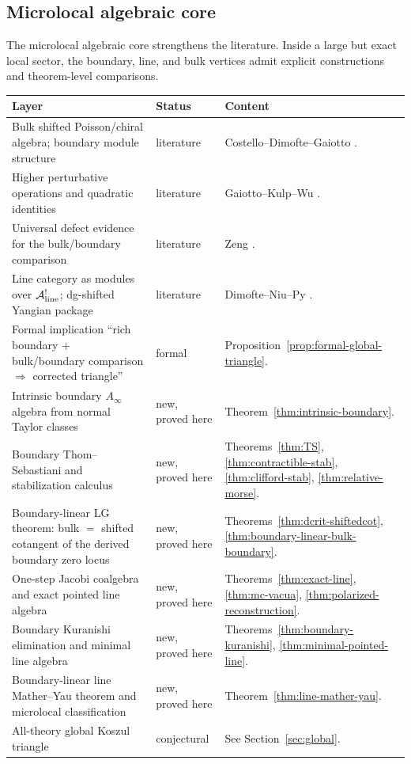 \subsection{Microlocal algebraic core}

The microlocal algebraic core strengthens the literature. Inside a large but exact local sector, the boundary, line, and bulk vertices admit explicit constructions and theorem-level comparisons.

\begin{center}
\renewcommand{\arraystretch}{1.2}
\begin{longtable}{|p{}|p{}|p{}|}
\hline
\textbf{Layer} & \textbf{Status} & \textbf{Content} \\
\hline
Bulk shifted Poisson/chiral algebra; boundary module structure & literature & Costello--Dimofte--Gaiotto \cite{CDG20}. \\
\hline
Higher perturbative operations and quadratic identities & literature & Gaiotto--Kulp--Wu \cite{GKW24}. \\
\hline
Universal defect evidence for the bulk/boundary comparison & literature & Zeng \cite{Zeng23}. \\
\hline
Line category as modules over $\mathcal{A}^!_{\mathrm{line}}$; dg-shifted Yangian package & literature & Dimofte--Niu--Py \cite{DNP25}. \\
\hline
Formal implication ``rich boundary + bulk/boundary comparison $\Rightarrow$ corrected triangle'' & formal & Proposition~\ref{prop:formal-global-triangle}. \\
\hline
Intrinsic boundary $A_\infty$ algebra from normal Taylor classes & new, proved here & Theorem~\ref{thm:intrinsic-boundary}. \\
\hline
Boundary Thom--Sebastiani and stabilization calculus & new, proved here & Theorems~\ref{thm:TS}, \ref{thm:contractible-stab}, \ref{thm:clifford-stab}, \ref{thm:relative-morse}. \\
\hline
Boundary-linear LG theorem: bulk $=$ shifted cotangent of the derived boundary zero locus & new, proved here & Theorems~\ref{thm:dcrit-shiftedcot}, \ref{thm:boundary-linear-bulk-boundary}. \\
\hline
One-step Jacobi coalgebra and exact pointed line algebra & new, proved here & Theorems~\ref{thm:exact-line}, \ref{thm:mc-vacua}, \ref{thm:polarized-reconstruction}. \\
\hline
Boundary Kuranishi elimination and minimal line algebra & new, proved here & Theorems~\ref{thm:boundary-kuranishi}, \ref{thm:minimal-pointed-line}. \\
\hline
Boundary-linear line Mather--Yau theorem and microlocal classification & new, proved here & Theorem~\ref{thm:line-mather-yau}. \\
\hline
All-theory global Koszul triangle & conjectural & See Section~\ref{sec:global}. \\
\hline
\end{longtable}
\end{center}


